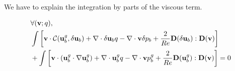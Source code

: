 \documentclass[twocolumn,10pt]{asme2ej}
\begin{document}
We have to explain the integration by parts of the viscous term.




\begin{eqnarray}
\label{NewtonWeak}
&\forall ({\bf v};q), \\
\displaystyle &\int \left[ {\bf v} \cdot {\cal C}( {\bf u}_b^g , \delta {\bf u}_b) +  \nabla  \cdot \delta {\bf u}_b q -\nabla  \cdot {\bf v} \delta p_b
+ \frac{2}{Re} {\bf D}(\delta {\bf u}_b) : {\bf D}({\bf v}) \right]
\nonumber
\\
\nonumber
\displaystyle & + \int \left[ {\bf v} \cdot ( {\bf u}_b^g \cdot \nabla {\bf u}_b^g) 
+ \nabla \cdot {\bf u}_b^g  q 
- \nabla \cdot {\bf v} p_b^g
+ \frac{2}{Re} {\bf D}({\bf u}_b^g) : {\bf D}({\bf v}) \right] = 0 
\end{eqnarray}





\end{document}
